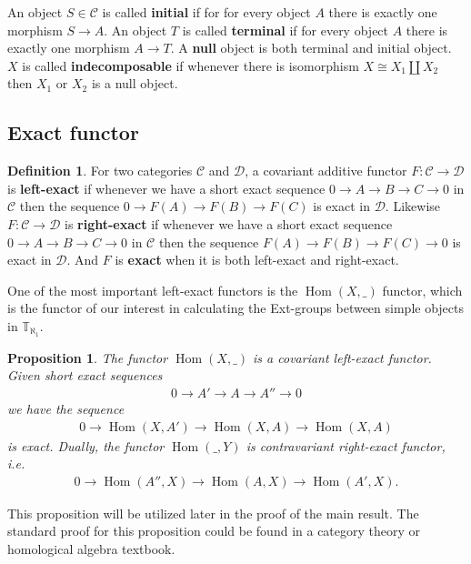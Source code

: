 \documentclass[openany, a4paper]{amsbook}
\newtheorem{prop}[thm]{Proposition}
\theoremstyle{definition}
\newtheorem{defn}[thm]{Definition}
\numberwithin{equation}{chapter}
\newcommand{\T}[1]{{\mathbb{T}}_{\aleph_{#1}}}
\DeclareMathOperator{\Hom}{\mathrm{Hom}}
\begin{document}
An object $S \in \mathcal{C}$ is called \textbf{initial} if for for every object $A$ there is exactly one morphism $S \to A$. An object $T$ is called \textbf{terminal} if for every object $A$ there is exactly one morphism $A \to T$. A \textbf{null} object is both terminal and initial object. $X$ is called \textbf{indecomposable} if whenever there is isomorphism $X \cong X_1 \coprod X_2$ then $X_1$ or $X_2$ is a null object.

\subsection{Exact functor}
\begin{defn}
    For two categories $\mathcal{C}$ and $\mathcal{D}$, a covariant additive functor $F: \mathcal{C} \to \mathcal{D} $ is \textbf{left-exact} if whenever we have a short exact sequence $0 \to A \to B \to C \to 0$ in $\mathcal{C}$ then the sequence $0 \to F(A) \to F(B) \to F(C)$ is exact in $\mathcal{D}$. Likewise $F: \mathcal{C} \to \mathcal{D} $ is \textbf{right-exact} if whenever we have a short exact sequence $0 \to A \to B \to C \to 0$ in $\mathcal{C}$ then the sequence $ F(A) \to F(B) \to F(C) \to 0$ is exact in $\mathcal{D}$. And $F$ is \textbf{exact} when it is both left-exact and right-exact.
\end{defn}

One of the most important left-exact functors is the $\Hom(X, \_)$ functor, which is the functor of our interest in calculating the Ext-groups between simple objects in $\T{1}$.
\begin{prop}\label{hom exact}
    The functor $\Hom(X, \_)$ is a covariant left-exact functor. Given short exact sequences
    \begin{align*}
        0 \to A' \to A \to A'' \to 0 
    \end{align*}
    we have the sequence
    \begin{align*}
        0 \to \Hom(X, A')  \to \Hom(X, A) \to \Hom(X, A)
    \end{align*}
    is exact. Dually, the functor $\Hom(\_, Y)$ is contravariant right-exact functor, i.e.
    \begin{align*}
        0 \to \Hom(A'', X)  \to \Hom(A, X) \to \Hom(A', X).
    \end{align*}
\end{prop}

This proposition will be utilized later in the proof of the main result. The standard proof for this proposition could be found in a category theory or homological algebra textbook.
\end{document}
